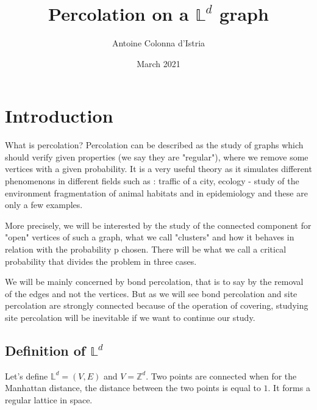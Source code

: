 \documentclass{article}
\title{Percolation on a $\mathbb{L}^d$ graph}
\author{Antoine Colonna d'Istria}
\date{March 2021}
\begin{document}
\maketitle

\section{Introduction}

What is percolation? Percolation can be described as the study of graphs which should verify given properties (we say they are "regular"), where we remove some vertices with a given probability. It is a very useful theory as it simulates different phenomenons in different fields such as : traffic of a city, ecology - study of the environment fragmentation of animal habitats and in epidemiology and these are only a few examples.

More precisely, we will be interested by the study of the connected component for "open" vertices of such a graph, what we call "clusters" and how it behaves in relation with the probability p chosen. There will be what we call a critical probability that divides the problem in three cases.

We will be mainly concerned by bond percolation, that is to say by the removal of the edges and not the vertices. But as we will see bond percolation and site percolation are strongly connected because of the operation of covering, studying site percolation will be inevitable if we want to continue our study.

\subsection{Definition of $\mathbb{L}^d$}
Let's define $\mathbb{L}^d=(V,E)$ and $V=\mathbb{Z}^d$. Two points are connected when for the Manhattan distance, the distance between the two points is equal to $1$. It forms a regular lattice in space. \\
\end{document}
